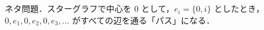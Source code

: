\subsection{}
ネタ問題．スターグラフで中心を $0$ として，$e_i=\{0, i\}$ としたとき，$0, e_1, 0, e_2, 0, e_3, \ldots$ がすべての辺を通る「パス」になる．